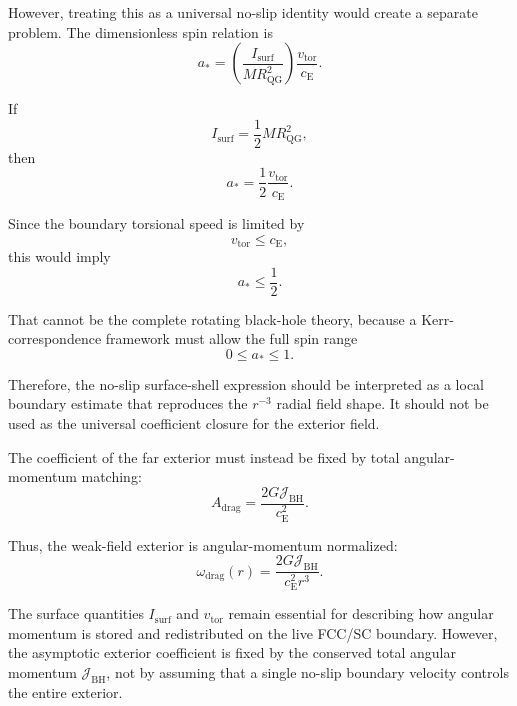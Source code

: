 However, treating this as a universal no-slip identity would create a separate problem. The dimensionless spin relation is
\begin{equation}
    a_\ast = \left( \frac{I_{\mathrm{surf}}}{M R_{\mathrm{QG}}^2} \right) \frac{v_{\mathrm{tor}}}{c_{\mathrm{E}}}.
\end{equation}

If
\begin{equation}
    I_{\mathrm{surf}} = \frac{1}{2} M R_{\mathrm{QG}}^2,
\end{equation}
then
\begin{equation}
    a_\ast = \frac{1}{2} \frac{v_{\mathrm{tor}}}{c_{\mathrm{E}}}.
\end{equation}

Since the boundary torsional speed is limited by
\begin{equation}
    v_{\mathrm{tor}} \leq c_{\mathrm{E}},
\end{equation}
this would imply
\begin{equation}
    a_\ast \leq \frac{1}{2}.
\end{equation}

That cannot be the complete rotating black-hole theory, because a Kerr-correspondence framework must allow the full spin range
\begin{equation}
    0 \leq a_\ast \leq 1.
\end{equation}

Therefore, the no-slip surface-shell expression should be interpreted as a local boundary estimate that reproduces the $r^{-3}$ radial field shape. It should not be used as the universal coefficient closure for the exterior field.

The coefficient of the far exterior must instead be fixed by total angular-momentum matching:
\begin{equation}
    \boxed{ A_{\mathrm{drag}} = \frac{2G\mathcal{J}_{\mathrm{BH}}}{c_{\mathrm{E}}^2}. }
\end{equation}

Thus, the weak-field exterior is angular-momentum normalized:
\begin{equation}
    \boxed{ \omega_{\mathrm{drag}}(r) = \frac{2G\mathcal{J}_{\mathrm{BH}}}{c_{\mathrm{E}}^2r^3}. }
\end{equation}

The surface quantities $I_{\mathrm{surf}}$ and $v_{\mathrm{tor}}$ remain essential for describing how angular momentum is stored and redistributed on the live FCC/SC boundary. However, the asymptotic exterior coefficient is fixed by the conserved total angular momentum $\mathcal{J}_{\mathrm{BH}}$, not by assuming that a single no-slip boundary velocity controls the entire exterior.

